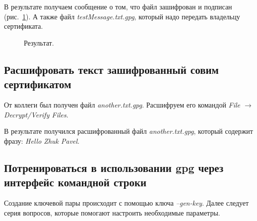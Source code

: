 \documentclass[10pt,a4paper,titlepage]{article}
\begin{document}
В результате получаем сообщение о том, что файл зашифрован и подписан \mbox{(рис. \ref{ris:image18})}. А также файл \textit{testMessage.txt.gpg}, который надо передать владельцу сертификата.

\begin{figure}[!h]	
\caption{Результат.}
\label{ris:image18}
\end{figure}

\pagebreak
\subsection{Расшифровать текст зашифрованный совим сертификатом}
От коллеги был получен файл \textit{another.txt.gpg}. Расшифруем его командой \textit{File $\rightarrow$ Decrypt/Verify Files}.

В результате получился расшифрованный файл \textit{another.txt.gpg}, который содержит фразу: \textit{Hello Zhuk Pavel}.

\subsection{Потренироваться в использовании gpg через интерфейс командной строки}
Создание ключевой пары происходит с помощью ключа \textit{--gen-key}. Далее следует серия вопросов, которые помогают настроить необходимые параметры.
\end{document}

